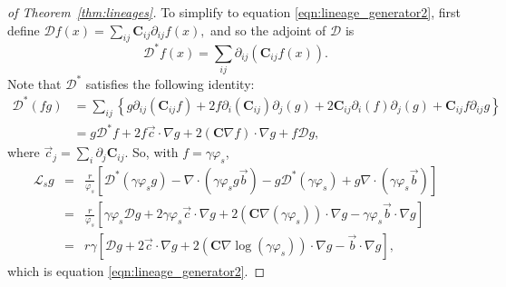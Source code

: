 \documentclass[EJP]{ejpecp} %
\newcommand{\grad}{\nabla}
\newcommand{\DD}{\mathcal{D}}  %
\newcommand{\meanq}{\vec b}    %
\newcommand{\covq}{\mathbf{C}}     %
\newcommand{\Lgen}{\mathcal{L}}    %
\begin{document}
\begin{proof}[of Theorem~\ref{thm:lineages}]
To simplify to equation \eqref{eqn:lineage_generator2},
first define
$
    \DD f(x) = \sum_{ij} \covq_{ij} \partial_{ij} f(x),
$
and so the adjoint of $\DD$ is
$$
    \DD^* f(x)
    =
    \sum_{ij} \partial_{ij} (\covq_{ij} f(x)) .
$$
Note that $\DD^*$ satisfies the following identity:
\begin{align*}
    \DD^*(fg)
    &=
    \sum_{ij} \left\{
        g \partial_{ij} (\covq_{ij} f)
        + 2 f \partial_{i} (\covq_{ij}) \partial_j(g)
        + 2 \covq_{ij} \partial_{i} (f) \partial_j(g)
        + \covq_{ij} f \partial_{ij} g
    \right\} \\
    &=
    g \DD^* f
    + 2 f \vec{c} \cdot \grad g
    + 2 (\covq \grad f) \cdot \grad g
    + f \DD g ,
\end{align*}
where $\vec{c}_j = \sum_i \partial_j \covq_{ij}$.
So, with $f = \gamma \varphi_s$,
\begin{eqnarray*}
\Lgen_s g
    &=&
    \frac{r}{\varphi_s} \left[
        \DD^*(\gamma \varphi_s g) - \grad \cdot (\gamma \varphi_s g \meanq)
        - g \DD^*(\gamma \varphi_s) + g \grad \cdot (\gamma \varphi_s \meanq)
    \right] \\
    &=&
    \frac{r}{\varphi_s} \left[
        \gamma \varphi_s \DD g
        + 2 \gamma \varphi_s \vec{c} \cdot \grad g
        + 2 (\covq \grad (\gamma \varphi_s)) \cdot \grad g
        - \gamma \varphi_s \meanq \cdot \grad g
    \right] \\
    &=&
    r \gamma \left[
        \DD g
        + 2 \vec{c} \cdot \grad g
        + 2 (\covq \grad \log(\gamma \varphi_s)) \cdot \grad g
        - \meanq \cdot \grad g
    \right] ,
\end{eqnarray*}
which is equation \eqref{eqn:lineage_generator2}.
\end{proof}
\end{document}
